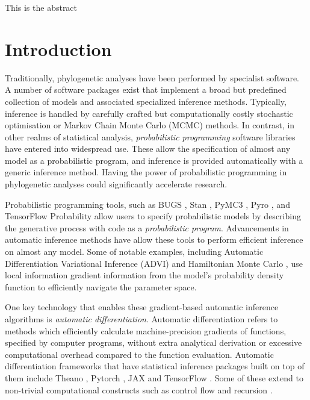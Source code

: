 

This is the abstract

\section{Introduction}

Traditionally, phylogenetic analyses have been performed by specialist software. A number of software packages exist that implement a broad but predefined collection of models and associated specialized inference methods. Typically, inference is handled by carefully crafted but computationally costly stochastic optimisation or Markov Chain Monte Carlo (MCMC) methods. In contrast, in other realms of statistical analysis, \textit{probabilistic programming} software libraries have entered into widespread use. These allow the specification of almost any model as a probabilistic program, and inference is provided automatically with a generic inference method. Having the power of probabilistic programming in phylogenetic analyses could significantly accelerate research. %

Probabilistic programming tools, such as BUGS \cite{lunn2000winbugs}, Stan \cite{carpenter2017stan}, PyMC3 \cite{salvatier2016probabilistic}, Pyro \cite{bingham2019pyro}, and TensorFlow Probability \cite{dillon2017tensorflow} allow users to specify probabilistic models by describing the generative process with code as a \textit{probabilistic program}. Advancements in automatic inference methods have allow these tools to perform efficient inference on almost any model. Some of notable examples, including Automatic Differentiation Variational Inference \cite{kucukelbir2017automatic} (ADVI) and Hamiltonian Monte Carlo \cite{duane1987hybrid}, use local information gradient information from the model's probability density function to efficiently navigate the parameter space.

One key technology that enables these gradient-based automatic inference algorithms is \textit{automatic differentiation}. Automatic differentiation refers to methods which efficiently calculate machine-precision gradients of functions, specified by computer programs, without extra analytical derivation or excessive computational overhead compared to the function evaluation. Automatic differentiation frameworks that have statistical inference packages built on top of them include Theano \cite{bergstra2010theano}, Pytorch \cite{paszke2019pytorch}, JAX \cite{jax2018github} and TensorFlow \cite{abadi2016tensorflow}. Some of these extend to non-trivial computational constructs such as control flow and recursion \cite{yu2018dynamic}.

